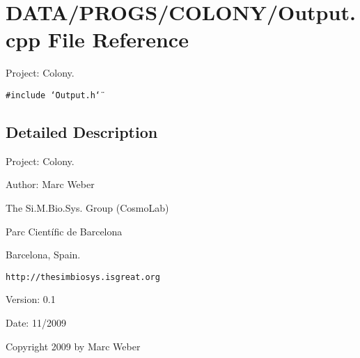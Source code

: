 \section{DATA/PROGS/COLONY/Output.cpp File Reference}
\label{Output_8cpp}
Project: Colony. 

{\tt \#include \char`\"{}Output.h\char`\"{}}\par


\subsection{Detailed Description}
Project: Colony. 

\begin{Desc}
\item[Author:]Marc Weber\par
 The Si.M.Bio.Sys. Group (CosmoLab)\par
 Parc Científic de Barcelona\par
 Barcelona, Spain.\par
 {\tt http://thesimbiosys.isgreat.org} \end{Desc}
\begin{Desc}
\item[Version:]0.1 \end{Desc}
\begin{Desc}
\item[Date:]11/2009\end{Desc}
Copyright 2009 by Marc Weber 